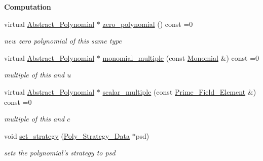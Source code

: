 \begin{Indent}\textbf{ Computation}\par
\begin{DoxyCompactItemize}
\item 
\mbox{\label{class_abstract___polynomial_ab50acaac5654329c0299d5694a25b1ed}} 
virtual \hyperlink{class_abstract___polynomial}{Abstract\+\_\+\+Polynomial} $\ast$ \hyperlink{class_abstract___polynomial_ab50acaac5654329c0299d5694a25b1ed}{zero\+\_\+polynomial} () const =0
\begin{DoxyCompactList}\small\item\em new zero polynomial of this same type \end{DoxyCompactList}\item 
\mbox{\label{class_abstract___polynomial_aacee94ef63116201c91c7d65779097d8}} 
virtual \hyperlink{class_abstract___polynomial}{Abstract\+\_\+\+Polynomial} $\ast$ \hyperlink{class_abstract___polynomial_aacee94ef63116201c91c7d65779097d8}{monomial\+\_\+multiple} (const \hyperlink{class_monomial}{Monomial} \&) const =0
\begin{DoxyCompactList}\small\item\em multiple of this and $u$ \end{DoxyCompactList}\item 
\mbox{\label{class_abstract___polynomial_a53b0ed425ff4bbbf01818005d6003d59}} 
virtual \hyperlink{class_abstract___polynomial}{Abstract\+\_\+\+Polynomial} $\ast$ \hyperlink{class_abstract___polynomial_a53b0ed425ff4bbbf01818005d6003d59}{scalar\+\_\+multiple} (const \hyperlink{class_prime___field___element}{Prime\+\_\+\+Field\+\_\+\+Element} \&) const =0
\begin{DoxyCompactList}\small\item\em multiple of this and $c$ \end{DoxyCompactList}\item 
\mbox{\label{class_abstract___polynomial_a780b8c4b18ae1df16ce680f79d9ace7b}} 
void \hyperlink{class_abstract___polynomial_a780b8c4b18ae1df16ce680f79d9ace7b}{set\+\_\+strategy} (\hyperlink{class_poly___strategy___data}{Poly\+\_\+\+Strategy\+\_\+\+Data} $\ast$psd)
\begin{DoxyCompactList}\small\item\em sets the polynomial's strategy to {\ttfamily psd} \end{DoxyCompactList}\end{DoxyCompactItemize}
\end{Indent}
